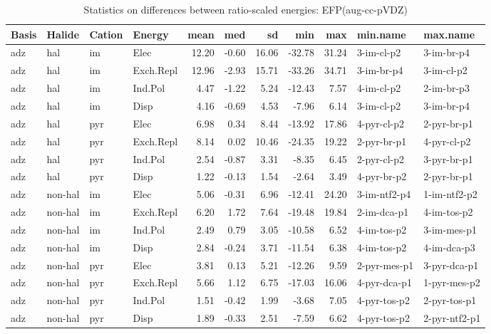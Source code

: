 \documentclass[a4paper]{article}
\begin{document}
\begin{table}[ht]
\centering
\begin{tabular}{llllrrrrrll}
  \hline
Basis & Halide & Cation & Energy & mean & med & sd & min & max & min.name & max.name \\ 
  \hline
adz & hal & im & Elec & 12.20 & -0.60 & 16.06 & -32.78 & 31.24 & 3-im-cl-p2 & 3-im-br-p4 \\ 
  adz & hal & im & Exch.Repl & 12.96 & -2.93 & 15.71 & -33.26 & 34.71 & 3-im-br-p4 & 3-im-cl-p2 \\ 
  adz & hal & im & Ind.Pol & 4.47 & -1.22 & 5.24 & -12.43 & 7.57 & 4-im-cl-p2 & 2-im-br-p3 \\ 
  adz & hal & im & Disp & 4.16 & -0.69 & 4.53 & -7.96 & 6.14 & 3-im-cl-p2 & 3-im-br-p4 \\ 
  adz & hal & pyr & Elec & 6.98 & 0.34 & 8.44 & -13.92 & 17.86 & 4-pyr-cl-p2 & 2-pyr-br-p1 \\ 
  adz & hal & pyr & Exch.Repl & 8.14 & 0.02 & 10.46 & -24.35 & 19.22 & 2-pyr-br-p1 & 4-pyr-cl-p2 \\ 
  adz & hal & pyr & Ind.Pol & 2.54 & -0.87 & 3.31 & -8.35 & 6.45 & 2-pyr-cl-p2 & 3-pyr-br-p1 \\ 
  adz & hal & pyr & Disp & 1.22 & -0.13 & 1.54 & -2.64 & 3.49 & 4-pyr-br-p2 & 2-pyr-br-p1 \\ 
  adz & non-hal & im & Elec & 5.06 & -0.31 & 6.96 & -12.41 & 24.20 & 3-im-ntf2-p4 & 1-im-ntf2-p2 \\ 
  adz & non-hal & im & Exch.Repl & 6.20 & 1.72 & 7.64 & -19.48 & 19.84 & 2-im-dca-p1 & 4-im-tos-p2 \\ 
  adz & non-hal & im & Ind.Pol & 2.49 & 0.79 & 3.05 & -10.58 & 6.52 & 4-im-tos-p2 & 3-im-mes-p1 \\ 
  adz & non-hal & im & Disp & 2.84 & -0.24 & 3.71 & -11.54 & 6.38 & 4-im-tos-p2 & 4-im-dca-p3 \\ 
  adz & non-hal & pyr & Elec & 3.81 & 0.13 & 5.21 & -12.26 & 9.59 & 2-pyr-mes-p1 & 3-pyr-dca-p1 \\ 
  adz & non-hal & pyr & Exch.Repl & 5.66 & 1.12 & 6.75 & -17.03 & 16.06 & 4-pyr-dca-p1 & 1-pyr-mes-p2 \\ 
  adz & non-hal & pyr & Ind.Pol & 1.51 & -0.42 & 1.99 & -3.68 & 7.05 & 4-pyr-tos-p2 & 2-pyr-tos-p1 \\ 
  adz & non-hal & pyr & Disp & 1.89 & -0.33 & 2.51 & -7.59 & 6.62 & 4-pyr-tos-p2 & 2-pyr-ntf2-p1 \\ 
   \hline
\end{tabular}
\caption{Statistics on differences between ratio-scaled energies: EFP(aug-cc-pVDZ)}
\end{table}
\end{document}
